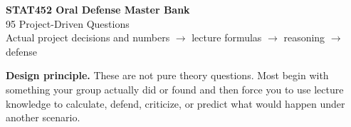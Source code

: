 \documentclass[10.5pt,a4paper]{article}
\begin{document}
\begin{center}
{\Huge\bfseries\color{navy} STAT452 Oral Defense Master Bank}\\[4pt]
{\Large 95 Project-Driven Questions}\\[5pt]
{\small Actual project decisions and numbers $\rightarrow$ lecture formulas $\rightarrow$ reasoning $\rightarrow$ defense}
\end{center}
\begin{tcolorbox}[colback=yellow!8,colframe=yellow!45!black,arc=2mm]
\textbf{Design principle.} These are not pure theory questions. Most begin with something your group actually did or found and then force you to use lecture knowledge to calculate, defend, criticize, or predict what would happen under another scenario.
\end{tcolorbox}
\end{document}
